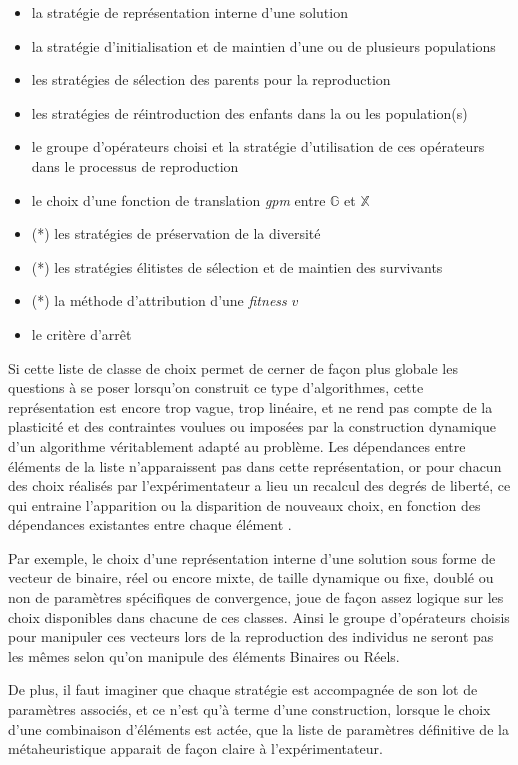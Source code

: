 \begin{itemize}
\item la stratégie de représentation interne d'une solution
\item la stratégie d'initialisation et de maintien d'une ou de plusieurs populations
\item les stratégies de sélection des parents pour la reproduction
\item les stratégies de réintroduction des enfants dans la ou les population(s)
\item le groupe d'opérateurs choisi et la stratégie d'utilisation de ces opérateurs dans le processus de reproduction
\item le choix d'une fonction de translation \textit{gpm} entre $\mathbb{G}$ et $\mathbb{X}$
\item (*) les stratégies de préservation de la diversité
\item (*) les stratégies élitistes de sélection et de maintien des survivants
\item (*) la méthode d'attribution d'une \textit{fitness} $v$
\item le critère d'arrêt
\end{itemize}

Si cette liste de classe de choix permet de cerner de façon plus globale les questions à se poser lorsqu'on construit ce type d'algorithmes, cette représentation est encore trop vague, trop linéaire, et ne rend pas compte de la plasticité et des contraintes voulues ou imposées par la construction dynamique d'un algorithme véritablement adapté au problème. Les dépendances entre éléments de la liste n'apparaissent pas dans cette représentation, or pour chacun des choix réalisés par l'expérimentateur a lieu un recalcul des degrés de liberté, ce qui entraine l'apparition ou la disparition de nouveaux choix, en fonction des dépendances existantes entre chaque élément .

Par exemple, le choix d'une représentation interne d'une solution sous forme de vecteur de binaire, réel ou encore mixte, de taille dynamique ou fixe, doublé ou non de paramètres spécifiques de convergence, joue de façon assez logique sur les choix disponibles dans chacune de ces classes. Ainsi le groupe d'opérateurs choisis pour manipuler ces vecteurs lors de la reproduction des individus ne seront pas les mêmes selon qu'on manipule des éléments Binaires ou Réels.

De plus, il faut imaginer que chaque stratégie est accompagnée de son lot de paramètres associés, et ce n'est qu'à terme d'une construction, lorsque le choix d'une combinaison d'éléments est actée, que la liste de paramètres définitive de la métaheuristique apparait de façon claire à l'expérimentateur.

